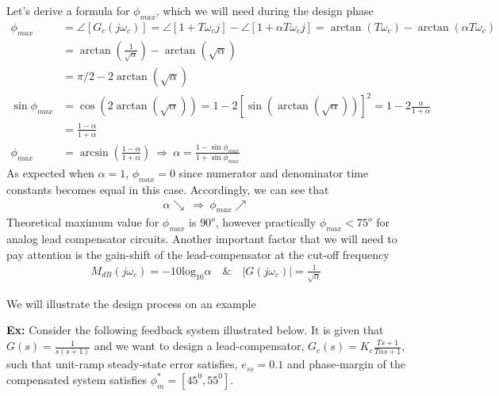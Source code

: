 \documentclass[twoside]{article}
\begin{document}
Let's derive a formula for $\phi_{max}$, which we will need during the 
design phase
%
\begin{align*}
    \phi_{max} &= \angle [ G_c( j \omega_c) ] = \angle \left[ 1 + T
  \omega_c j \right] - \angle \left[ 1 + \alpha T
  \omega_c j \right] = \arctan(T \omega_c) - \arctan(\alpha  T \omega_c)
  \\
  &= \arctan \left( \frac{1}{\sqrt{\alpha}}  \right) - \arctan \left(
    \sqrt{\alpha} \right) 
    \\
  &= \pi/2 - 2 \arctan \left( \sqrt{\alpha} \right)
\\
\sin \phi_{max} &=  \cos \left( 2 \arctan \left( \sqrt{\alpha} \right)
                  \right)
                  = 1 - 2 \left[ \sin\left( \arctan \left( \sqrt{\alpha} \right)
                  \right) \right]^2 = 1 - 2 \frac{\alpha}{1 + \alpha}
                  \\
&= \frac{1 - \alpha}{1 + \alpha}
  \\
    \phi_{max} &= \arcsin \left( \frac{1 - \alpha}{1 + \alpha} \right)
        \         \Rightarrow \ \alpha = \frac{1 - \sin \phi_{max}}{1
                 + \sin \phi_{max}}
\end{align*}
%
As expected when $\alpha = 1$, $\phi_{max} = 0$ since numerator 
and denominator time constants becomes equal in this
case. Accordingly, we can see that 
%
\begin{align*}
  \alpha \searrow \ \Rightarrow \ \phi_{max} \nearrow
\end{align*}
%
Theoretical maximum value for $\phi_{max}$ is $90^o$,
however practically $\phi_{max} < 75^o$ for analog 
lead compensator circuits. Another important factor that 
we will need to pay attention is the gain-shift of
the lead-compensator at the cut-off frequency 
%
\begin{align*}
  M_{dB}(j \omega_c) = -10 \mathrm{log}_{10} \alpha \quad \& \quad
  | G(j \omega_c) | = \frac{1}{\sqrt{\alpha}}
\end{align*}
%

We will illustrate the design process on an example 

\vspace{6pt}

\textbf{Ex:} Consider the following feedback system illustrated below.
It is given that $G(s) = \frac{1}{s (s+1)}$ and we want to
design a lead-compensator, $G_c(s) = K_c \frac{T s + 1}{T \alpha s +
  1}$, such that unit-ramp steady-state error satisfies, $e_{ss} = 0.1$ and phase-margin of the compensated system satisfies $\phi_m^* =
\left[ 45^0 , 55^0 \right]$. 
\end{document}
